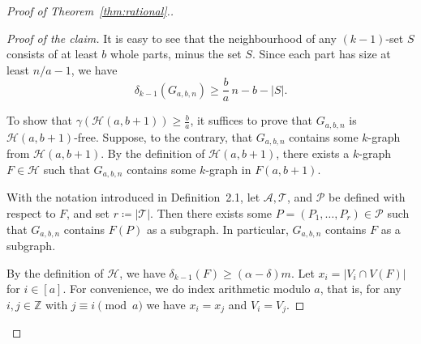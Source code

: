 \documentclass[11pt,a4paper]{article}
\theoremstyle{remark}
\newenvironment{poc}{\begin{proof}[Proof of the claim]\renewcommand*{\qedsymbol}{$\blacksquare$}}{\end{proof}}
\newcommand{\hide}[1]{}
\begin{document}
\begin{proof}[Proof of Theorem~\ref{thm:rational}.]
\begin{poc}
It is easy to see that the neighbourhood of any $(k-1)$-set $S$ consists of at least $b$ whole parts, minus the set $S$.
\hide{The neighbourhood of a $(k-1)$-set $S$ behaves as follows.
\begin{itemize}
    \item If $S$ lies entirely within a single part, then its neighbourhood consists of $b$ parts, each of size at least $n/a - 1$.
    \item If $S$ is contained in at least three of the parts 
    $V_1, V_2, \dots, V_a$, then its neighbourhood is the entire set $[n] \setminus S$.
    \item If $S$ is contained in exactly two of the parts $V_1, V_2, \dots, V_a$, then its neighbourhood consists of vertices from at least $a-2 \ge b$ parts, each of size at least $n/a - 1$, when $b \neq a-1$,
and is the entire set $[n]\setminus S$ when $b = a-1$.
\end{itemize}
}%
 Since each part has size at least $n/a-1$, we have
\[
\delta_{k-1}(G_{a,b,n}) \ge \frac{b}{a}\, n - b-|S|.
\]
 


To show that $\gamma(\mathcal{H}(a,b+1)) \ge \frac{b}{a}$, it suffices to prove that 
$G_{a,b,n}$ is $\mathcal{H}(a,b+1)$-free. 
Suppose, to the contrary, that $G_{a,b,n}$ contains some $k$-graph from 
$\mathcal{H}(a,b+1)$. By the definition of $\mathcal{H}(a,b+1)$, there exists a $k$-graph 
$F \in \mathcal{H}$ such that $G_{a,b,n}$ contains some $k$-graph in $F(a,b+1)$.

With the notation introduced in Definition~2.1, let $\mathcal{A}, \mathcal{T}$, and 
$\mathcal{P}$ be defined with respect to $F$, and set $r \coloneqq |\mathcal{T}|$. 
Then there exists some $P = (P_1,\ldots,P_r) \in \mathcal{P}$ such that 
$G_{a,b,n}$ contains $F(P)$ as a subgraph. In particular, $G_{a,b,n}$ 
contains $F$ as a subgraph.

By the definition of $\mathcal{H}$, we have 
$\delta_{k-1}(F) \ge (\alpha - \delta)m$.
Let  $x_i = |V_i\cap V(F)|$ for $i\in[a]$. 
For convenience, we do index arithmetic modulo $a$, that is, for any $i,j \in \mathbb{Z}$ with  $j \equiv i \pmod a$ we have $x_i = x_j$ and $V_i = V_j$. 


\end{poc}
\end{proof}
\end{document}

